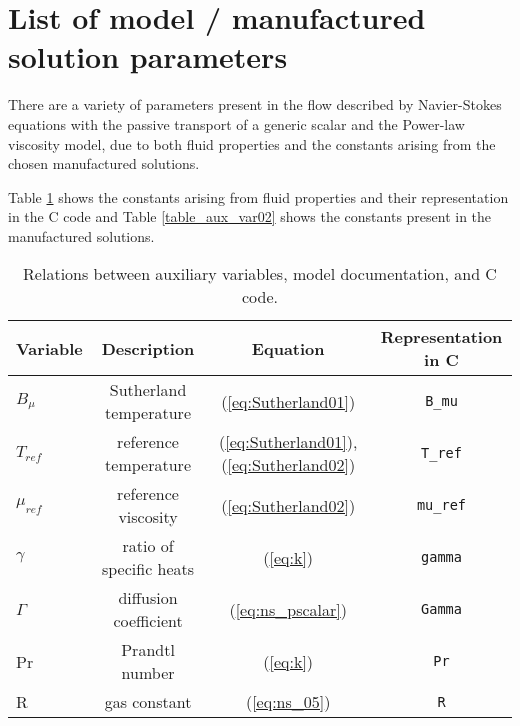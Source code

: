 \section{List of model / manufactured solution parameters}\label{Appendix:01}

There are a variety of parameters present in the flow described by Navier-Stokes equations with the passive transport of a generic scalar and the Power-law viscosity model, due to both fluid properties and the constants arising from the chosen manufactured solutions.



Table \ref{table_aux_var} shows the constants arising from fluid properties and their representation in the C code and Table \ref{table_aux_var02} shows the constants present in the manufactured solutions.


\begin{table}[htb]
\caption{Relations between auxiliary variables, model documentation, and C code.}
\centering
\begin{tabular}{l c c c}
\hline\hline
     Variable    &  Description & Equation &Representation in C  \\ [0.25ex]
\hline 
$B_\mu$   	& Sutherland temperature			& (\ref{eq:Sutherland01})	& \texttt{B\_mu}		\vspace{2pt} \\
$T_{ref}$ 	& reference temperature					& (\ref{eq:Sutherland01}), (\ref{eq:Sutherland02})	& \texttt{T\_ref}		\vspace{2pt} \\
$\mu_{ref}$	& reference viscosity					& (\ref{eq:Sutherland02})	& \texttt{mu\_ref} 	\vspace{2pt} \\
$\gamma$	& ratio of specific heats				& (\ref{eq:k})			& \texttt{gamma}		\vspace{2pt} \\
$\Gamma$	& diffusion coefficient					& (\ref{eq:ns_pscalar})	& \texttt{Gamma}		\vspace{2pt} \\
Pr			& Prandtl number						& (\ref{eq:k})			& \texttt{Pr}		\vspace{2pt} \\
R			& gas constant							& (\ref{eq:ns_05})		& \texttt{R}			\vspace{2pt} \\
\hline
\end{tabular}
\label{table_aux_var}
\end{table}

